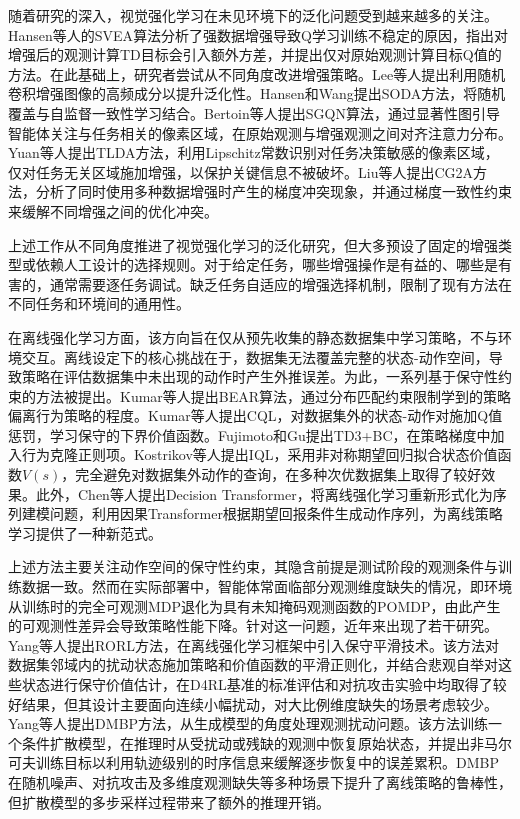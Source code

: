 随着研究的深入，视觉强化学习在未见环境下的泛化问题受到越来越多的关注。Hansen等人的SVEA\cite{hansen2021stabilizing}算法分析了强数据增强导致Q学习训练不稳定的原因，指出对增强后的观测计算TD目标会引入额外方差，并提出仅对原始观测计算目标Q值的方法。在此基础上，研究者尝试从不同角度改进增强策略。Lee\cite{lee2019network}等人提出利用随机卷积增强图像的高频成分以提升泛化性。Hansen和Wang提出SODA\cite{hansen2021generalization}方法，将随机覆盖与自监督一致性学习结合。Bertoin等人提出SGQN\cite{bertoin2022look}算法，通过显著性图引导智能体关注与任务相关的像素区域，在原始观测与增强观测之间对齐注意力分布。Yuan等人提出TLDA\cite{yuan2022tlda}方法，利用Lipschitz常数识别对任务决策敏感的像素区域，仅对任务无关区域施加增强，以保护关键信息不被破坏。Liu等人提出CG2A\cite{liu2023cg2a}方法，分析了同时使用多种数据增强时产生的梯度冲突现象，并通过梯度一致性约束来缓解不同增强之间的优化冲突。

上述工作从不同角度推进了视觉强化学习的泛化研究，但大多预设了固定的增强类型或依赖人工设计的选择规则。对于给定任务，哪些增强操作是有益的、哪些是有害的，通常需要逐任务调试。缺乏任务自适应的增强选择机制，限制了现有方法在不同任务和环境间的通用性。

在离线强化学习方面，该方向旨在仅从预先收集的静态数据集中学习策略，不与环境交互。离线设定下的核心挑战在于，数据集无法覆盖完整的状态-动作空间，导致策略在评估数据集中未出现的动作时产生外推误差。为此，一系列基于保守性约束的方法被提出。Kumar等人提出BEAR\cite{kumar2019stabilizing}算法，通过分布匹配约束限制学到的策略偏离行为策略的程度。Kumar等人提出CQL\cite{kumar2020conservative}，对数据集外的状态-动作对施加Q值惩罚，学习保守的下界价值函数。Fujimoto和Gu提出TD3+BC\cite{fujimoto2019off}，在策略梯度中加入行为克隆正则项。Kostrikov等人提出IQL\cite{kostrikov2022offline}，采用非对称期望回归拟合状态价值函数$V(s)$，完全避免对数据集外动作的查询，在多种次优数据集上取得了较好效果。此外，Chen等人提出Decision Transformer\cite{chen2021decision}，将离线强化学习重新形式化为序列建模问题，利用因果Transformer根据期望回报条件生成动作序列，为离线策略学习提供了一种新范式。

上述方法主要关注动作空间的保守性约束，其隐含前提是测试阶段的观测条件与训练数据一致。然而在实际部署中，智能体常面临部分观测维度缺失的情况，即环境从训练时的完全可观测MDP退化为具有未知掩码观测函数的POMDP，由此产生的可观测性差异会导致策略性能下降。针对这一问题，近年来出现了若干研究。Yang等人\cite{yang2022rorl}提出RORL方法，在离线强化学习框架中引入保守平滑技术。该方法对数据集邻域内的扰动状态施加策略和价值函数的平滑正则化，并结合悲观自举对这些状态进行保守价值估计，在D4RL基准的标准评估和对抗攻击实验中均取得了较好结果，但其设计主要面向连续小幅扰动，对大比例维度缺失的场景考虑较少。Yang等人\cite{yang2024dmbp}提出DMBP方法，从生成模型的角度处理观测扰动问题。该方法训练一个条件扩散模型，在推理时从受扰动或残缺的观测中恢复原始状态，并提出非马尔可夫训练目标以利用轨迹级别的时序信息来缓解逐步恢复中的误差累积。DMBP在随机噪声、对抗攻击及多维度观测缺失等多种场景下提升了离线策略的鲁棒性，但扩散模型的多步采样过程带来了额外的推理开销。

